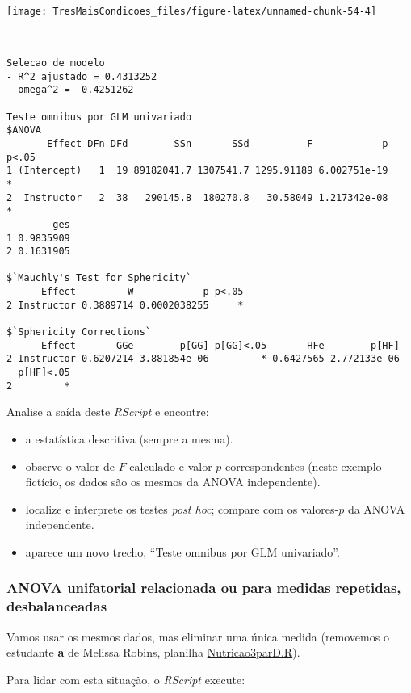 \documentclass[]{article}
\providecommand{\tightlist}{%
  \setlength{\itemsep}{0pt}\setlength{\parskip}{0pt}}
\begin{document}
\begin{center}\texttt{[image: TresMaisCondicoes\_files/figure-latex/unnamed-chunk-54-4]} \end{center}

\begin{verbatim}


Selecao de modelo
- R^2 ajustado = 0.4313252 
- omega^2 =  0.4251262 

Teste omnibus por GLM univariado
$ANOVA
       Effect DFn DFd        SSn       SSd          F            p p<.05
1 (Intercept)   1  19 89182041.7 1307541.7 1295.91189 6.002751e-19     *
2  Instructor   2  38   290145.8  180270.8   30.58049 1.217342e-08     *
        ges
1 0.9835909
2 0.1631905

$`Mauchly's Test for Sphericity`
      Effect         W            p p<.05
2 Instructor 0.3889714 0.0002038255     *

$`Sphericity Corrections`
      Effect       GGe        p[GG] p[GG]<.05       HFe        p[HF]
2 Instructor 0.6207214 3.881854e-06         * 0.6427565 2.772133e-06
  p[HF]<.05
2         *
\end{verbatim}

Analise a saída deste \emph{RScript} e encontre:

\begin{itemize}
\tightlist
\item
  a estatística descritiva (sempre a mesma).
\item
  observe o valor de \(F\text{ calculado}\) e valor-\(p\)
  correspondentes (neste exemplo fictício, os dados são os mesmos da
  ANOVA independente).
\item
  localize e interprete os testes \emph{post hoc}; compare com os
  valores-\(p\) da ANOVA independente.
\item
  aparece um novo trecho, ``Teste omnibus por GLM univariado''.
\end{itemize}

\subsubsection{ANOVA unifatorial relacionada ou para medidas repetidas,
desbalanceadas}\label{anova-unifatorial-relacionada-ou-para-medidas-repetidas-desbalanceadas}

Vamos usar os mesmos dados, mas eliminar uma única medida (removemos o
estudante \textbf{a} de Melissa Robins, planilha \url{Nutricao3parD.R}).

Para lidar com esta situação, o \emph{RScript} execute:
\end{document}
